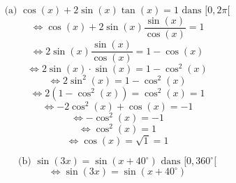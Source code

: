 \documentclass{article}
\begin{document}
\[ \text{(a) } \cos(x) + 2\sin(x)\tan(x) = 1 \text{ dans } [0, 2\pi[ \]
\[ \Leftrightarrow \cos(x) + 2\sin(x) \frac{\sin(x)}{\cos(x)} = 1 \]
\[ \Leftrightarrow 2\sin(x) \frac{\sin(x)}{\cos(x)} = 1 - \cos(x) \]
\[ \Leftrightarrow 2\sin(x) \cdot \sin(x)  = 1 - \cos^2(x) \]
\[ \Leftrightarrow 2\sin^2(x) = 1 - \cos^2(x) \]
\[ \Leftrightarrow 2(1 - \cos^2(x)) = \cos^2(x) = 1 \]
\[ \Leftrightarrow - 2\cos^2(x) + \cos(x) = -1 \]
\[ \Leftrightarrow -\cos^2(x) = -1 \]
\[ \Leftrightarrow \cos^2(x) = 1 \]
\[ \Leftrightarrow \cos(x) = \sqrt{1} = 1 \]

\[ \text{(b) } \sin(3x) = \sin(x + 40^\circ) \text{ dans } [0, 360^\circ[ \]
\[ \Leftrightarrow \sin(3x) = \sin(x + 40^\circ) \]
\end{document}
